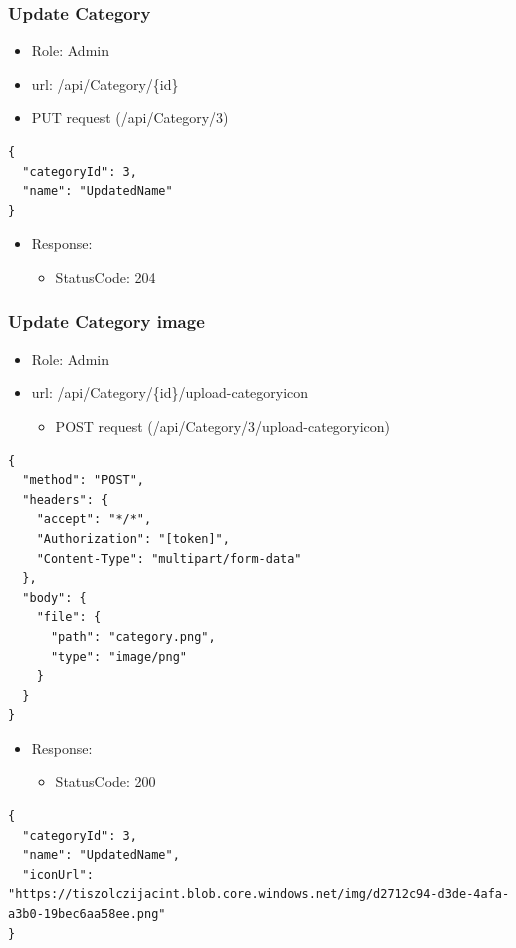 \documentclass[11pt]{article}
\begin{document}
\subsubsection{Update Category}
\label{sec:orgb3760d5}
\begin{itemize}
\item Role: Admin
\item url: /api/Category/\{id\}
\item PUT request (/api/Category/3)
\end{itemize}
\begin{verbatim}
{
  "categoryId": 3,
  "name": "UpdatedName"
}
\end{verbatim}
\begin{itemize}
\item Response:
\begin{itemize}
\item StatusCode: 204
\end{itemize}
\end{itemize}
\subsubsection{Update Category image}
\label{sec:orga81418f}
\begin{itemize}
\item Role: Admin
\item url: /api/Category/\{id\}/upload-categoryicon
\begin{itemize}
\item POST request (/api/Category/3/upload-categoryicon)
\end{itemize}
\end{itemize}
\begin{verbatim}
{
  "method": "POST",
  "headers": {
    "accept": "*/*",
    "Authorization": "[token]",
    "Content-Type": "multipart/form-data"
  },
  "body": {
    "file": {
      "path": "category.png",
      "type": "image/png"
    }
  }
}

\end{verbatim}
\begin{itemize}
\item Response:
\begin{itemize}
\item StatusCode: 200
\end{itemize}
\end{itemize}
\begin{verbatim}
{
  "categoryId": 3,
  "name": "UpdatedName",
  "iconUrl": "https://tiszolczijacint.blob.core.windows.net/img/d2712c94-d3de-4afa-a3b0-19bec6aa58ee.png"
}
\end{verbatim}
\end{document}
